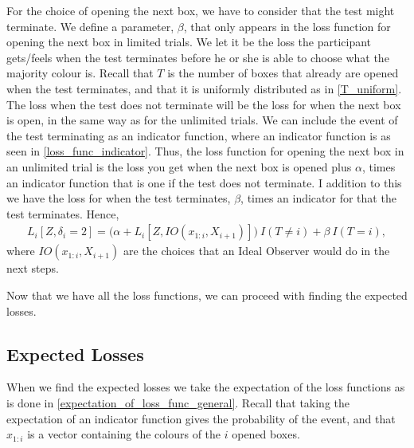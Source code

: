 For the choice of opening the next box, we have to consider that the test might terminate. 
We define a parameter, $\beta$, that only appears in the loss function for opening the next box in limited trials. 
We let it be the loss the participant gets/feels when the test terminates before he or she is able to choose what the majority colour is.
Recall that $T$ is the number of boxes that already are opened when the test terminates, and that it is uniformly distributed as in \eqref{T_uniform}. The loss when the test does not terminate will be the loss for when the next box is open, in the same way as for the unlimited trials. We can include the event of the test terminating as an indicator function, where an indicator function is as seen in \eqref{loss_func_indicator}. Thus, the loss function for opening the next box in an unlimited trial is the loss you get when the next box is opened plus $\alpha$, times an indicator function that is one if the test does not terminate. I addition to this we have the loss for when the test terminates, $\beta$, times an indicator for that the test terminates. Hence,
\begin{equation}
\label{loss_func_2_limited}
    \begin{aligned}
        L_i[Z,\delta_i=2] = \big( \alpha + L_i[Z,IO(x_{1:i},X_{i+1})] \big) \: I(T\neq i) + \beta \: I(T=i),
    \end{aligned}
\end{equation}
where $IO(x_{1:i},X_{i+1})$ are the choices that an Ideal Observer would do in the next steps. 

Now that we have all the loss functions, we can proceed with finding the expected losses. 

\subsection{Expected Losses}
\label{section:exp_losses}
When we find the expected losses we take the expectation of the loss functions as is done in \eqref{expectation_of_loss_func_general}. Recall that taking the expectation of an indicator function gives the probability of the event, and that $x_{1:i}$ is a vector containing the colours of the $i$ opened boxes.


